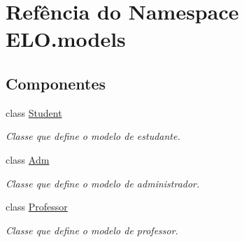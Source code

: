 \hypertarget{namespaceELO_1_1models}{\section{Refência do Namespace E\-L\-O.\-models}
\label{namespaceELO_1_1models}
}
\subsection*{Componentes}
\begin{DoxyCompactItemize}
\item 
class \hyperlink{classELO_1_1models_1_1Student}{Student}
\begin{DoxyCompactList}\small\item\em Classe que define o modelo de estudante. \end{DoxyCompactList}\item 
class \hyperlink{classELO_1_1models_1_1Adm}{Adm}
\begin{DoxyCompactList}\small\item\em Classe que define o modelo de administrador. \end{DoxyCompactList}\item 
class \hyperlink{classELO_1_1models_1_1Professor}{Professor}
\begin{DoxyCompactList}\small\item\em Classe que define o modelo de professor. \end{DoxyCompactList}\end{DoxyCompactItemize}

